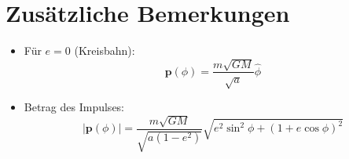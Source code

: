 \section{Zusätzliche Bemerkungen}
\begin{itemize}
    \item Für $e = 0$ (Kreisbahn):
    \[
    \mathbf{p}(\phi) = \frac{m \sqrt{GM}}{\sqrt{a}} \hat{\phi}
    \]
    
    \item Betrag des Impulses:
    \[
    |\mathbf{p}(\phi)| = \frac{m \sqrt{GM}}{\sqrt{a (1 - e^2)}} \sqrt{e^2 \sin^2 \phi + (1 + e \cos \phi)^2}
    \]
\end{itemize}